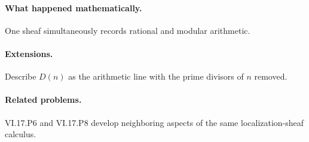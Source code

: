 \paragraph{What happened mathematically.}
One sheaf simultaneously records rational and modular arithmetic.

\paragraph{Extensions.}
Describe $D(n)$ as the arithmetic line with the prime divisors of $n$ removed.

\paragraph{Related problems.}
VI.17.P6 and VI.17.P8 develop neighboring aspects of the same localization-sheaf calculus.
\fi
